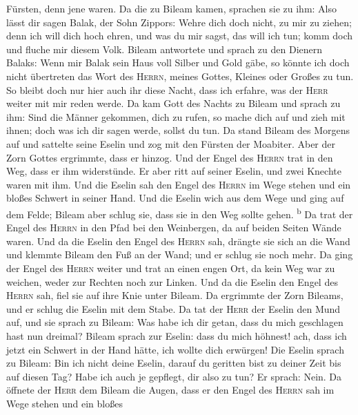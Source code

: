 Fürsten, denn jene waren.  Da die zu Bileam kamen,
sprachen sie zu ihm: Also lässt dir sagen Balak, der Sohn Zippors: Wehre
dich doch nicht, zu mir zu ziehen;  denn ich will dich
hoch ehren, und was du mir sagst, das will ich tun; komm doch und fluche
mir diesem Volk.  Bileam antwortete und sprach zu den
Dienern Balaks: Wenn mir Balak sein Haus voll Silber und Gold gäbe, so
könnte ich doch nicht übertreten das Wort des \textsc{Herrn}, meines
Gottes, Kleines oder Großes zu tun.  So bleibt doch nur
hier auch ihr diese Nacht, dass ich erfahre, was der \textsc{Herr}
weiter mit mir reden werde.  Da kam Gott des Nachts zu
Bileam und sprach zu ihm: Sind die Männer gekommen, dich zu rufen, so
mache dich auf und zieh mit ihnen; doch was ich dir sagen werde, sollst
du tun.  Da stand Bileam des Morgens auf und sattelte
seine Eselin und zog mit den Fürsten der Moabiter.  Aber
der Zorn Gottes ergrimmte, dass er hinzog. Und der Engel des
\textsc{Herrn} trat in den Weg, dass er ihm widerstünde. Er aber ritt
auf seiner Eselin, und zwei Knechte waren mit ihm.  Und
die Eselin sah den Engel des \textsc{Herrn} im Wege stehen und ein
bloßes Schwert in seiner Hand. Und die Eselin wich aus dem Wege und ging
auf dem Felde; Bileam aber schlug sie, dass sie in den Weg sollte gehen.
\textsuperscript{b}  Da trat der Engel des \textsc{Herrn}
in den Pfad bei den Weinbergen, da auf beiden Seiten Wände waren.
 Und da die Eselin den Engel des \textsc{Herrn} sah,
drängte sie sich an die Wand und klemmte Bileam den Fuß an der Wand; und
er schlug sie noch mehr.  Da ging der Engel des
\textsc{Herrn} weiter und trat an einen engen Ort, da kein Weg war zu
weichen, weder zur Rechten noch zur Linken.  Und da die
Eselin den Engel des \textsc{Herrn} sah, fiel sie auf ihre Knie unter
Bileam. Da ergrimmte der Zorn Bileams, und er schlug die Eselin mit dem
Stabe.  Da tat der \textsc{Herr} der Eselin den Mund auf,
und sie sprach zu Bileam: Was habe ich dir getan, dass du mich
geschlagen hast nun dreimal?  Bileam sprach zur Eselin:
dass du mich höhnest! ach, dass ich jetzt ein Schwert in der Hand hätte,
ich wollte dich erwürgen!  Die Eselin sprach zu Bileam:
Bin ich nicht deine Eselin, darauf du geritten bist zu deiner Zeit bis
auf diesen Tag? Habe ich auch je gepflegt, dir also zu tun? Er sprach:
Nein.  Da öffnete der \textsc{Herr} dem Bileam die Augen,
dass er den Engel des \textsc{Herrn} sah im Wege stehen und ein bloßes
